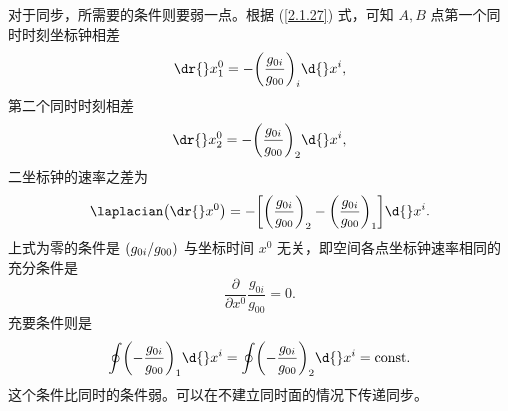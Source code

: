 \documentclass[UTF8, 12pt, a4paper, oneside, onecolumn, fontset=none]{ctexart}
\begin{document}
对于同步，所需要的条件则要弱一点。根据 (\ref{2.1.27}) 式，可知 $A, B$ 点第一个同时时刻坐标钟相差
\begin{equation}
\dr{}x_{1}^{0}=-\mleft(\frac{g_{0i}}{g_{00}}\mright)_{i}\d{}x^{i},
\end{equation}
第二个同时时刻相差
\begin{equation}
\dr{}x_{2}^{0}=-\mleft(\frac{g_{0i}}{g_{00}}\mright)_{2}\d{}x^{i},
\end{equation}
二坐标钟的速率之差为
\begin{equation}
\laplacian\mleft(\dr{}x^{0}\mright)=-\mleft[\mleft(\frac{g_{0i}}{g_{00}}\mright)_{2}-\mleft(\frac{g_{0i}}{g_{00}}\mright)_{1}\mright]\d{}x^{i}.
\end{equation}
上式为零的条件是 $\mleft(g_{0i}/g_{00}\mright)$ 与坐标时间 $x^{0}$ 无关，即空间各点坐标钟速率相同的充分条件是
\begin{equation}
\frac{\partial{}}{\partial{}x^{0}}\frac{g_{0i}}{g_{00}}=0.
\end{equation}
充要条件则是
\begin{equation}
\oint\mleft(-\frac{g_{0i}}{g_{00}}\mright)_{1}\d{}x^{i}=\oint\mleft(-\frac{g_{0i}}{g_{00}}\mright)_{2}\d{}x^{i}=\mathrm{const}.
\end{equation}
这个条件比同时的条件弱。可以在不建立同时面的情况下传递同步。
\end{document}
